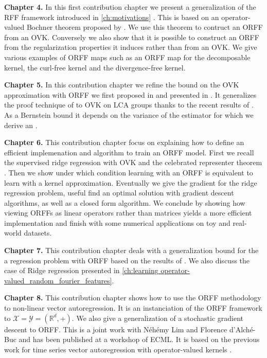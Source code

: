 \textbf{Chapter 4.}
In this first contribution chapter we present a generalization of the \acs{RFF}
framework introduced in \cref{ch:motivations} \citep{brault2016random}. This is
based on an operator-valued Bochner theorem proposed by \citet{Carmeli2010}. We
use this theorem to contruct an \acf{ORFF} from an \acs{OVK}. Conversely we
also show that it is possible to construct an \acs{ORFF} from the
regularization properties it induces rather than from an \acs{OVK}. We give
various examples of \acs{ORFF} maps such as an \acs{ORFF} map for the
decomposable kernel, the curl-free kernel and the divergence-free kernel.

\textbf{Chapter 5.} 
In this contribution chapter we refine the bound on the \ac{OVK} approximation
with \ac{ORFF} we first proposed in \cite{brault2016random} and presented in
\cite{braultborne}. It generalizes the proof technique of \citet{Rahimi2007} to
\ac{OVK} on \ac{LCA} groups thanks to the recent results of
\citet{sutherland2015, tropp2015introduction, minsker2011some,
koltchinskii2013remark}. As a Bernstein bound it depends on the variance of the
estimator for which we derive an .

\textbf{Chapter 6.}
This contribution chapter focus on explaining how to define an efficient
implemenation and algorithm to train an \acs{ORFF} model. First we recall
the supervised ridge regression with \acs{OVK} and the celebrated representer
theorem \citep{Wahba90}. Then we show under which condition learning with an
\acs{ORFF} is equivalent to learn with a kernel approximation. Eventually
we give the gradient for the ridge regression problem, useful find an optimal
solution with gradient descent algorithms, as well as a closed form algorithm.
We conclude by showing how viewing \acsp{ORFF} as linear operators rather than 
matrices yields a more efficient implementation and finish with some numerical
applications on toy and real-world datasets.

\textbf{Chapter 7.}
This contribution chapter deals with a generalization bound for the a
regression problem with ORFF based on the results of \citet{rahimi2009weighted,
maurer2016vector}.  We also discuss the case of Ridge regression presented in
\cref{ch:learning operator-valued_random_fourier_features}.

\textbf{Chapter 8.}
This contribution chapter shows how to use the \acs{ORFF} methodology to
non-linear vector autoregression. It is an instanciation of the \acs{ORFF}
framework to $\mathcal{X}=\mathcal{Y}=(\mathbb{R}^d, +)$. We also give a
generalization of a stochastic gradient descent \citep{dai2014scalable} to
\acs{ORFF}. This is a joint work with N\'eh\'emy Lim and Florence d'Alch\'e-Buc
and has been published at a workshop of \acs{ECML}. It is based on the previous
work \citet{Lim2015} for time series vector autoregression with operator-valued
kernels \cite{brault2016scaling}.

